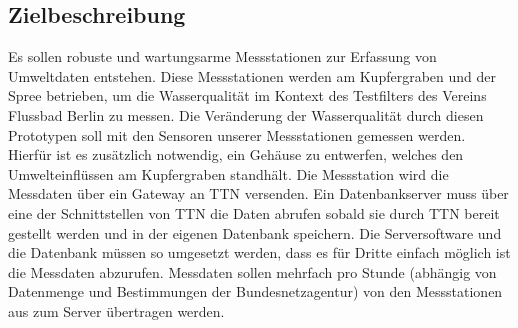 \subsection{Zielbeschreibung}

Es sollen robuste und wartungsarme Messstationen zur Erfassung von Umweltdaten entstehen. Diese Messstationen werden am Kupfergraben und
der Spree betrieben, um die Wasserqualität im Kontext des Testfilters des Vereins Flussbad Berlin zu messen. Die Veränderung der Wasserqualität
durch diesen Prototypen soll mit den Sensoren unserer Messstationen gemessen werden. Hierfür ist es zusätzlich notwendig, ein Gehäuse zu entwerfen,
welches den Umwelteinflüssen am Kupfergraben standhält.\newline
Die Messstation wird die Messdaten über ein Gateway an TTN versenden. Ein Datenbankserver muss über eine der Schnittstellen von TTN die Daten
abrufen sobald sie durch TTN bereit gestellt werden und in der eigenen Datenbank speichern. Die Serversoftware und die Datenbank müssen so
umgesetzt werden, dass es für Dritte einfach möglich ist die Messdaten abzurufen. Messdaten sollen mehrfach pro Stunde (abh\"angig von Datenmenge und Bestimmungen der Bundesnetzagentur) von den Messstationen aus zum Server \"ubertragen werden.
